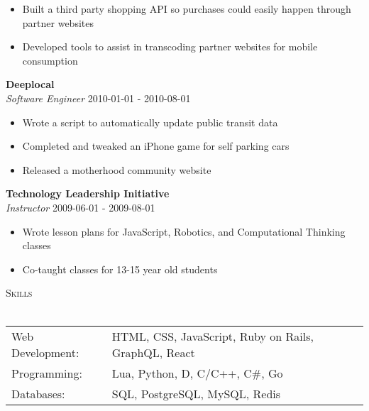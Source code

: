 \documentclass[a4paper]{article}
\newcommand{\lineunder} {
    \vspace*{-8pt} \\
    \hspace*{-18pt} \hrulefill \\
}
\newcommand{\header} [1] {
    {\hspace*{-18pt}\vspace*{6pt} \textsc{#1}}
    \vspace*{-6pt} \lineunder
}
\begin{document}
\vspace{-1mm}
\begin{itemize} \itemsep 1pt
	\item Built a third party shopping API so purchases could easily happen through partner websites
	\item Developed tools to assist in \textquotedbl{}transcoding\textquotedbl{} partner websites for mobile consumption
\end{itemize}
\textbf{Deeplocal}\\
\textit{Software Engineer} \hfill 2010-01-01 - 2010-08-01\\
\vspace{-1mm}
\begin{itemize} \itemsep 1pt
	\item Wrote a script to automatically update public transit data
	\item Completed and tweaked an iPhone game for self parking cars
	\item Released a motherhood community website
\end{itemize}
\textbf{Technology Leadership Initiative}\\
\textit{Instructor} \hfill 2009-06-01 - 2009-08-01\\
\vspace{-1mm}
\begin{itemize} \itemsep 1pt
	\item Wrote lesson plans for JavaScript, Robotics, and Computational Thinking classes
	\item Co-taught classes for 13-15 year old students
\end{itemize}

\header{Skills}
\begin{tabular}{ l l }
	Web Development: & HTML, CSS, JavaScript, Ruby on Rails, GraphQL, React \\
	Programming:     & Lua, Python, D, C/C++, C\#, Go                       \\
	Databases:       & SQL, PostgreSQL, MySQL, Redis                        \\
\end{tabular}
\vspace{2mm}





\ 
\end{document}
